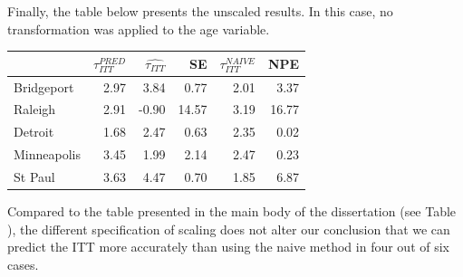 \documentclass[]{article}
\begin{document}
Finally, the table below presents the unscaled results. In this case, no
transformation was applied to the age variable.

\begin{longtable}[]{@{}lrrrrr@{}}
\toprule
& \(\tau_{ITT}^{PRED}\) & \(\hat{\tau_{ITT}}\) & SE &
\(\tau_{ITT}^{NAIVE}\) & NPE\tabularnewline
\midrule
\endhead
Bridgeport & 2.97 & 3.84 & 0.77 & 2.01 & 3.37\tabularnewline
Raleigh & 2.91 & -0.90 & 14.57 & 3.19 & 16.77\tabularnewline
Detroit & 1.68 & 2.47 & 0.63 & 2.35 & 0.02\tabularnewline
Minneapolis & 3.45 & 1.99 & 2.14 & 2.47 & 0.23\tabularnewline
St Paul & 3.63 & 4.47 & 0.70 & 1.85 & 6.87\tabularnewline
\bottomrule
\end{longtable}

Compared to the table presented in the main body of the dissertation
(see Table ), the different specification of scaling does not alter our
conclusion that we can predict the ITT more accurately than using the
naive method in four out of six cases.
\end{document}
